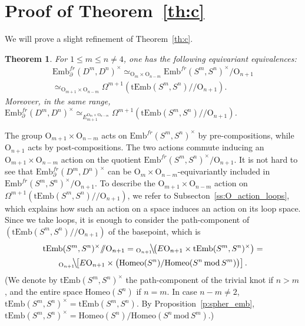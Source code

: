 \documentclass[11pt]{amsart}
\newtheorem{theorem}{Theorem}[section]
\theoremstyle{definition}
\newcommand{\Embfrmn}{\mathrm{Emb}_\partial^{fr}(D^m,D^n)}
\newcommand{\Embfr}{\mathrm{Emb}^{fr}}
\newcommand{\tEmb}{\mathrm{tEmb}}
\newcommand{\Homeo}{\mathrm{Homeo}}
\newcommand{\OO}{\mathrm{O}}
\newcommand{\mmod}{\,\mathrm{mod}\,}
\numberwithin{equation}{section}
\begin{document}
\section{Proof of Theorem~\ref{th:c}}\label{s:proof_c}
We will prove a slight refinement of Theorem~\ref{th:c}.

\begin{theorem}\label{th:c_refined}
For $1\leq m\leq n\neq 4$, one has the following equivariant equivalences:
\begin{multline}
\Embfrmn^\times\simeq_{\OO_m{\times}\OO_{n-m}}\Embfr(S^m,S^n)^\times/\OO_{n+1}\\
\simeq_{\OO_{m+1}{\times}\OO_{n-m}}\Omega^{m+1}\left(\tEmb(S^m,S^n)/\!\!/\OO_{n+1}\right).
\label{eq_c_refined}
\end{multline}
Moreover, in the same range, $\Embfrmn^\times\simeq_{E_{m+1}^{\OO_m{\times}\OO_{n-m}}} \Omega^{m+1}\left(\tEmb(S^m,S^n)/\!\!/\OO_{n+1}\right)$.
\end{theorem}

The group $\OO_{m+1}\times\OO_{n-m}$ acts on $\Embfr(S^m,S^n)^\times$ by pre-compositions, while $\OO_{n+1}$ acts by post-compositions. The two actions commute inducing an 
$\OO_{m+1}\times\OO_{n-m}$ action on the quotient $\Embfr(S^m,S^n)^\times/\OO_{n+1}$. It is not hard to see that $\Embfrmn^\times$ can be $\OO_{m}\times\OO_{n-m}$-equivariantly
included in $\Embfr(S^m,S^n)^\times/\OO_{n+1}$. To describe the $\OO_{m+1}\times\OO_{n-m}$ action on $\Omega^{m+1}\left(\tEmb(S^m,S^n)/\!\!/\OO_{n+1}\right)$, we refer to Subsecton~\ref{ss:O_action_loops},
which explains how  such an action on a space induces an action on its loop space. Since we take loops, it is enough to consider the path-component of $\left(\tEmb(S^m,S^n)/\!\!/\OO_{n+1}\right)$
of the basepoint, which is
\begin{multline}
\tEmb(S^m,S^n)^\times/\!\!/\OO_{n+1} ={}_{\OO_{n+1}}\!\!{\text{\large$\backslash$}}\!\!\left(E\OO_{n+1}\times \tEmb(S^m,S^n)^\times\right)=\\
_{\OO_{n+1}}\!\!{\text{\large$\backslash$}}\!\!\left[E\OO_{n+1}\times\bigl(\Homeo(S^n)/\Homeo(S^n\mmod S^m)\bigr)\right].\label{eq:c_refined2}
\end{multline}
(We denote by $\tEmb(S^m,S^n)^\times$ the path-component of the trivial knot if $n>m$, and the entire space $\Homeo(S^n)$ if $n=m$. In case $n-m\neq 2$, $\tEmb(S^m,S^n)^\times=\tEmb(S^m,S^n)$.
By %
Proposition~\ref{p:spher_emb}, $\tEmb(S^m,S^n)^\times=\Homeo(S^n)/\Homeo(S^n\mmod S^m)$.)
\end{document}
